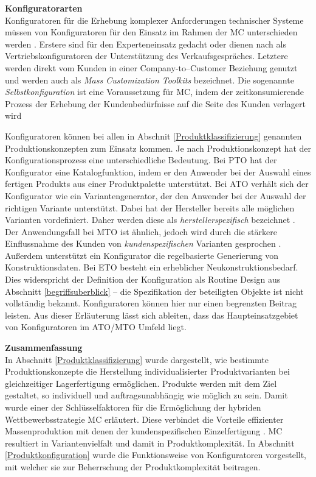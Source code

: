 \documentclass[11pt, a4paper, titlepage, listof=totoc, bibliography=totoc, index=totoc, twoside, openright, headings=normal, draft]{scrreprt}
\begin{document}
\textbf{Konfiguratorarten}\\
Konfiguratoren für die Erhebung komplexer Anforderungen technischer Systeme  müssen von Konfiguratoren für den Einsatz im Rahmen der \ac{MC} unterschieden werden \citep{felferning14}. Erstere sind für den Experteneinsatz gedacht oder dienen nach \citet{piller06} als Vertriebskonfiguratoren der Unterstützung des Verkaufsgespräches. Letztere werden direkt vom Kunden in einer Company-to–Customer Beziehung genutzt und werden auch als \emph{Mass Customization Toolkits} bezeichnet. Die sogenannte \emph{Selbstkonfiguration} ist eine Voraussetzung für \ac{MC}, indem der zeitkonsumierende Prozess der Erhebung der Kundenbedürfnisse auf die Seite des Kunden verlagert wird \citep{piller06}

Konfiguratoren können bei allen in Abschnit \ref{Produktklassifizierung} genannten Produktionskonzepten zum Einsatz kommen. Je nach Produktionskonzept hat der Konfigurationsprozess eine unterschiedliche Bedeutung. Bei \ac{PTO} hat der Konfigurator eine Katalogfunktion, indem er den Anwender bei der Auswahl eines fertigen Produkts aus einer Produktpalette unterstützt. Bei \ac{ATO} verhält sich der Konfigurator wie ein Variantengenerator, der den Anwender bei der Auswahl der richtigen Variante unterstützt. Dabei hat der Hersteller bereits alle möglichen Varianten vordefiniert. Daher werden diese als \emph{herstellerspezifisch} bezeichnet \citep{schomburg80}. Der Anwendungsfall bei \ac{MTO} ist ähnlich, jedoch wird durch die stärkere Einflussnahme des Kunden von \emph{kundenspezifischen} Varianten gesprochen \citep{schomburg80}. Außerdem unterstützt ein Konfigurator die regelbasierte Generierung von Konstruktionsdaten. Bei \ac{ETO} besteht ein erheblicher Neukonstruktionsbedarf. Dies widerspricht der Definition der Konfiguration als Routine Design aus Abschnitt \ref{begriffsuberblick} -- die Spezifikation der beteiligten Objekte ist nicht vollständig bekannt. Konfiguratoren können hier nur einen begrenzten Beitrag leisten. Aus dieser Erläuterung lässt sich ableiten, dass das Haupteinsatzgebiet von Konfiguratoren im \ac{ATO}/\ac{MTO} Umfeld liegt.

\textbf{Zusammenfassung}\\
In Abschnitt \ref{Produktklassifizierung} wurde dargestellt, wie bestimmte Produktionskonzepte die Herstellung individualisierter Produktvarianten bei gleichzeitiger Lagerfertigung ermöglichen. Produkte werden mit dem Ziel gestaltet, so individuell und auftragsunabhängig wie möglich zu sein. Damit wurde einer der Schlüsselfaktoren für die Ermöglichung der hybriden Wettbewerbsstrategie \ac{MC} erläutert. Diese verbindet die Vorteile effizienter Massenproduktion mit denen
der kundenspezifischen Einzelfertigung \citep{piller98}. \ac{MC} resultiert in Variantenvielfalt und damit in Produktkomplexität. In Abschnitt \ref{Produktkonfiguration} wurde die Funktionsweise von Konfiguratoren vorgestellt, mit welcher sie zur Beherrschung der Produktkomplexität beitragen.
\end{document}
